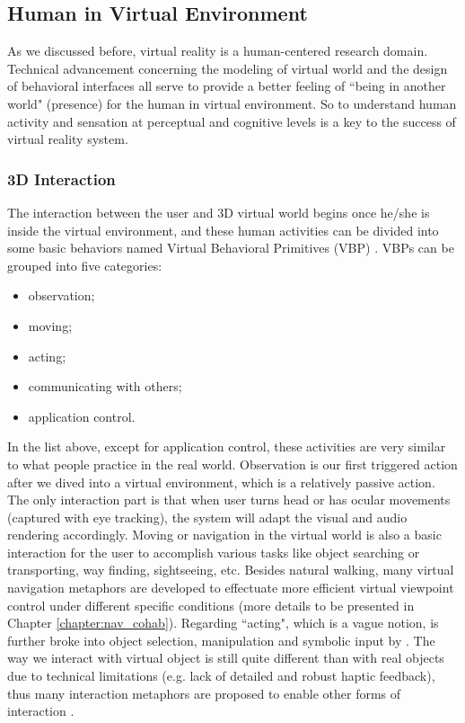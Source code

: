 \subsection{Human in Virtual Environment}
As we discussed before, virtual reality is a human-centered research domain. Technical advancement concerning the modeling of virtual world and the design of behavioral interfaces all serve to provide a better feeling of ``being in another world" (presence) for the human in virtual environment. So to understand human activity and sensation at perceptual and cognitive levels is a key to the success of virtual reality system.

\subsubsection{3D Interaction}
\label{sec:3D_inter}
The interaction between the user and 3D virtual world begins once he/she is inside the virtual environment, and these human activities can be divided into some basic behaviors named Virtual Behavioral Primitives (VBP) \citet{Fuchs2011Book}. VBPs can be grouped into five categories:

\begin{itemize}
  \item observation;
  \item moving;
  \item acting;
  \item communicating with others;
  \item application control.
\end{itemize}

In the list above, except for application control, these activities are very similar to what people practice in the real world. Observation is our first triggered action after we dived into a virtual environment, which is a relatively passive action. The only interaction part is that when user turns head or has ocular movements (captured with eye tracking), the system will adapt the visual and audio rendering accordingly. Moving or navigation in the virtual world is also a basic interaction for the user to accomplish various tasks like object searching or transporting, way finding, sightseeing, etc. Besides natural walking, many virtual navigation metaphors are developed to effectuate more efficient virtual viewpoint control under different specific conditions (more details to be presented in Chapter \ref{chapter:nav_cohab}). Regarding ``acting", which is a vague notion, is further broke into object selection, manipulation and symbolic input by \citet{Bowman2004UIT}. The way we interact with virtual object is still quite different than with real objects due to technical limitations (e.g. lack of detailed and robust haptic feedback), thus many interaction metaphors are proposed to enable other forms of interaction \citep{Hand1997Survey}.


